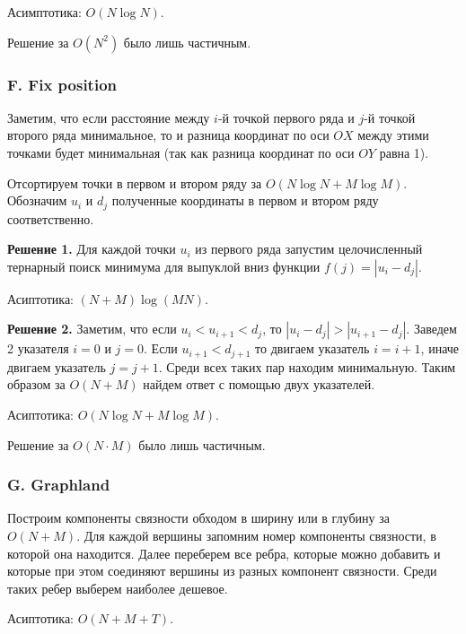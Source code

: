 Асимптотика: $O(N \log N)$. 

Решение за $O(N^2)$ было лишь частичным.

\subsubsection*{F. Fix position}



Заметим, что если расстояние между $i$-й точкой первого ряда и $j$-й точкой второго ряда минимальное, то и разница координат по оси $OX$ между этими точками будет минимальная (так как разница координат по оси $OY$ равна 1). 

Отсортируем точки в первом и втором ряду за $O(N \log N + M \log M)$. Обозначим $u_i$ и $d_j$ полученные координаты в первом и втором ряду соответственно.

\textbf{Решение 1.} Для каждой точки $u_i$ из первого ряда запустим целочисленный тернарный поиск минимума для выпуклой вниз функции $f(j) = |u_i  - d_j|$.

Асиптотика: $(N + M) \log (M N)$.

\textbf{Решение 2.} Заметим, что если $u_i < u_{i+1} < d_j$, то $|u_i - d_j|> |u_{i+1} - d_j|$. Заведем 2 указателя $i = 0$ и $j = 0$. Если $u_{i+1} < d_{j + 1}$ то двигаем указатель $i = i + 1$, иначе двигаем указатель $j = j + 1$. Среди всех таких пар находим минимальную. Таким образом за $O(N + M)$ найдем ответ с помощью двух указателей.

Асиптотика: $O(N \log N + M \log M)$.

Решение за $O(N \cdot M)$ было лишь частичным.

\subsubsection*{G. Graphland}




Построим компоненты связности обходом в ширину или в глубину за $O(N + M)$. Для каждой вершины запомним номер компоненты связности, в которой она находится. Далее переберем все ребра, которые можно добавить и которые при этом соединяют вершины из разных компонент связности. Среди таких ребер выберем наиболее дешевое.

Асиптотика: $O(N + M + T)$.